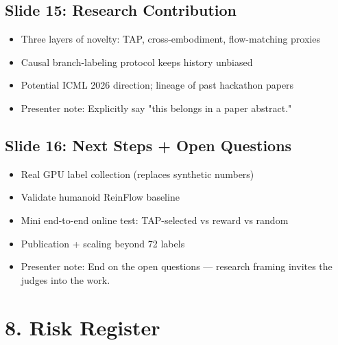 \documentclass[11pt,letterpaper]{article}
\begin{document}
\subsection*{Slide 15: Research Contribution}

\begin{itemize}
\item Three layers of novelty: TAP, cross-embodiment, flow-matching proxies
\item Causal branch-labeling protocol keeps history unbiased
\item Potential ICML 2026 direction; lineage of past hackathon papers
\item Presenter note: Explicitly say "this belongs in a paper abstract."
\end{itemize}

\subsection*{Slide 16: Next Steps + Open Questions}

\begin{itemize}
\item Real GPU label collection (replaces synthetic numbers)
\item Validate humanoid ReinFlow baseline
\item Mini end-to-end online test: TAP-selected vs reward vs random
\item Publication + scaling beyond 72 labels
\item Presenter note: End on the open questions --- research framing invites the judges into the work.
\end{itemize}

\medskip

\section*{8. Risk Register}
\end{document}
